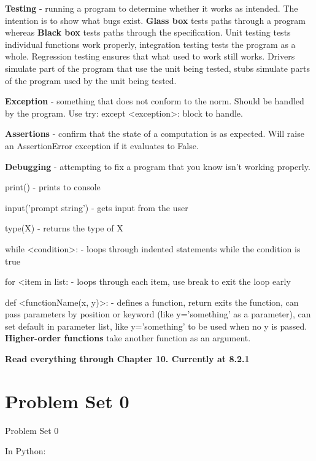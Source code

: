 \textbf{Testing} - running a program to determine whether it works as intended. The intention is to show what bugs exist. \textbf{Glass box} tests paths through a program whereas \textbf{Black box} tests paths through the specification. Unit testing tests individual functions work properly, integration testing tests the program as a whole. Regression testing ensures that what used to work still works. Drivers simulate part of the program that use the unit being tested, stubs simulate parts of the program used by the unit being tested.

\textbf{Exception} - something that does not conform to the norm. Should be handled by the program. Use try: except <exception>: block to handle.

\textbf{Assertions} - confirm that the state of a computation is as expected. Will raise an AssertionError exception if it evaluates to False.

\textbf{Debugging} - attempting to fix a program that you know isn't working properly.

print() - prints to  console 

input('prompt string') - gets input from the user

type(X) - returns the type of X

while <condition>: - loops through indented statements while the condition is true

for <item in list: - loops through each item, use break to exit the loop early

def <functionName(x, y)>: - defines a function, return exits the function, can pass parameters by position or keyword (like y='something' as a parameter), can set default in parameter list, like y='something' to be used when no y is passed. \textbf{Higher-order functions} take another function as an argument.





\textbf{Read everything through Chapter 10. Currently at 8.2.1}

\newpage
\onecolumn
\section{Problem Set 0}

\begin{problem}{Problem Set 0}
\end{problem}
\begin{solution}
In Python:

\end{solution}
\newpage
